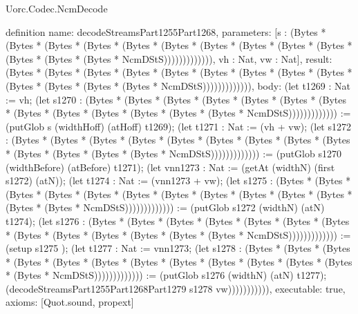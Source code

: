 \begin{lexlean}{Uorc.Codec.NcmDecode}
\begin{semanticmodule}
definition{
  name: decodeStreamsPart1255Part1268,
  parameters: [s : (Bytes * (Bytes * (Bytes * (Bytes * (Bytes * (Bytes * (Bytes * (Bytes * (Bytes * (Bytes * (Bytes * (Bytes * (Bytes * NcmDStS))))))))))))), vh : Nat, vw : Nat],
  result: (Bytes * (Bytes * (Bytes * (Bytes * (Bytes * (Bytes * (Bytes * (Bytes * (Bytes * (Bytes * (Bytes * (Bytes * (Bytes * NcmDStS))))))))))))),
  body: (let t1269 : Nat := vh; (let s1270 : (Bytes * (Bytes * (Bytes * (Bytes * (Bytes * (Bytes * (Bytes * (Bytes * (Bytes * (Bytes * (Bytes * (Bytes * (Bytes * NcmDStS))))))))))))) := (putGlob s (widthHoff) (atHoff) t1269); (let t1271 : Nat := (vh + vw); (let s1272 : (Bytes * (Bytes * (Bytes * (Bytes * (Bytes * (Bytes * (Bytes * (Bytes * (Bytes * (Bytes * (Bytes * (Bytes * (Bytes * NcmDStS))))))))))))) := (putGlob s1270 (widthBefore) (atBefore) t1271); (let vnn1273 : Nat := (getAt (widthN) (first s1272) (atN)); (let t1274 : Nat := (vnn1273 + vw); (let s1275 : (Bytes * (Bytes * (Bytes * (Bytes * (Bytes * (Bytes * (Bytes * (Bytes * (Bytes * (Bytes * (Bytes * (Bytes * (Bytes * NcmDStS))))))))))))) := (putGlob s1272 (widthN) (atN) t1274); (let s1276 : (Bytes * (Bytes * (Bytes * (Bytes * (Bytes * (Bytes * (Bytes * (Bytes * (Bytes * (Bytes * (Bytes * (Bytes * (Bytes * NcmDStS))))))))))))) := (setup s1275 ); (let t1277 : Nat := vnn1273; (let s1278 : (Bytes * (Bytes * (Bytes * (Bytes * (Bytes * (Bytes * (Bytes * (Bytes * (Bytes * (Bytes * (Bytes * (Bytes * (Bytes * NcmDStS))))))))))))) := (putGlob s1276 (widthN) (atN) t1277); (decodeStreamsPart1255Part1268Part1279 s1278 vw))))))))))),
  executable: true,
  axioms: [Quot.sound, propext]
}


\end{semanticmodule}
\end{lexlean}
